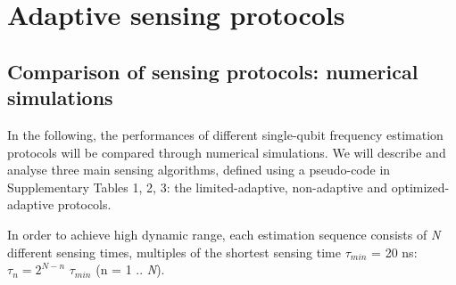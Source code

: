 \documentclass{report}
\begin{document}

\chapter[Adaptive sensing protocols]{Adaptive sensing protocols}
\label{ch:AMMappendix}

\section{Comparison of sensing protocols: numerical simulations}

In the following, the performances of different single-qubit frequency estimation protocols will be compared through numerical simulations. We will describe and analyse three main sensing algorithms, defined using a pseudo-code in Supplementary Tables 1, 2, 3: the limited-adaptive, non-adaptive and optimized-adaptive protocols.

In order to achieve high dynamic range, each estimation sequence consists of \textit{N} different sensing times, multiples of the shortest sensing time $\tau_{min}$ = 20 ns: $\tau_n = 2^{N-n}$ $\tau_{min}$ (n = 1 .. \textit{N}).

\clearpage

%
%
\end{document}
